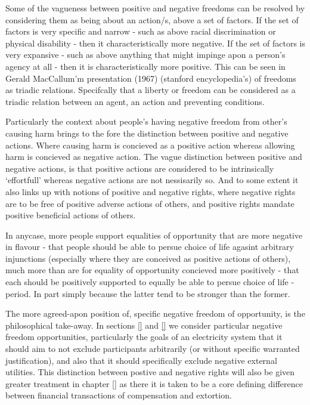 Some of the vagueness between positive and negative freedoms can be resolved by considering them as being about an action/s, above a set of factors.
If the set of factors is very specific and narrow - such as above racial discrimination or physical disability - then it characteristically more negative.
If the set of factors is very expansive - such as above anything that might impinge apon a person's agency at all - then it is characteristically more positive.
This can be seen in Gerald MacCallum'm presentation (1967) (stanford encyclopedia's) of freedoms as triadic relations. Specifcally that a liberty or freedom can be considered as a triadic relation between an agent, an action and preventing conditions.

Particularly the context about people's having negative freedom from other's causing harm brings to the fore the distinction between positive and negative actions.
Where causing harm is concieved as a positive action whereas allowing harm is concieved as negative action.
The vague distinction between positive and negative actions, is that positive actions are considered to be intrinsically `effortfull' whereas negative actions are not nessisarily so.\cite{Mossel2009} And to some extent it also links up with notions of positive and negative rights, where negative rights are to be free of positive adverse actions of others, and positive rights mandate positive beneficial actions of others.

In anycase, more people support equalities of opportunity that are more negative in flavour - that people should be able to persue choice of life agasint arbitrary injunctions (especially where they are conceived as positive actions of others), 
much more than are for equality of opportunity concieved more positively - that each should be positively supported to equally be able to persue choice of life -period.
In part simply because the latter tend to be stronger than the former.


The more agreed-apon position of, specific negative freedom of opportunity, is the philosophical take-away.
In sections \ref{} and \ref{} we consider particular negative freedom opportunities, particularly the goals of an electricity system that it should aim to not exclude participants arbitrarily (or without specific warranted justification), and also that it should specifically exclude negative external utilities.
This distinction between postive and negative rights will also be given greater treatment in chapter \ref{} as there it is taken to be a core defining difference between financial transactions of compensation and extortion.







